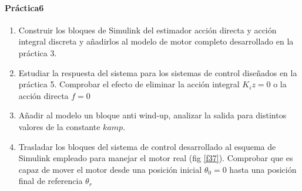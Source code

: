 \documentclass[10pt,a4paper]{report}
\begin{document}
\paragraph{Práctica6}
\begin{enumerate}
\item  Construir los bloques de Simulink del estimador acción directa y  acción integral discreta y añadirlos al modelo de motor completo desarrollado en la práctica 3.
 \item Estudiar la respuesta del sistema para los sistemas de control diseñados en la práctica 5. Comprobar el efecto de eliminar la acción integral $K_iz=0$ o la acción directa $f=0$
 \item Añadir al modelo un bloque anti wind-up, analizar la salida para distintos valores de la constante $kamp$.
\item Trasladar los bloques del sistema de control desarrollado al esquema de Simulink empleado para manejar el motor real (fig \ref{f37}). Comprobar que es capaz de mover el motor desde una posición inicial $\theta_0 = 0$ hasta una posición final de referencia $\theta_r$
\end{enumerate}



{}
\end{document}
